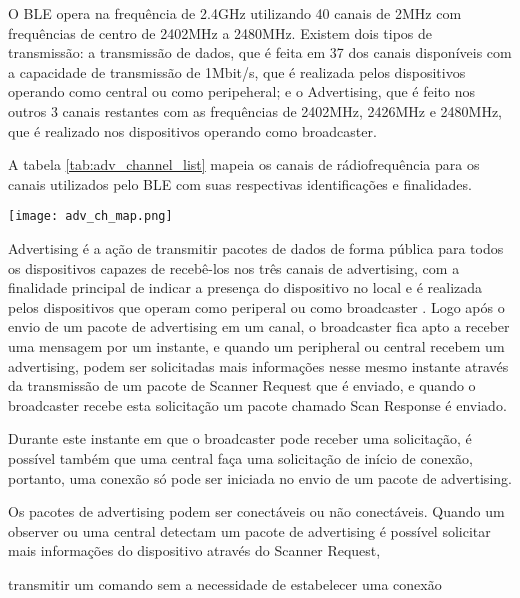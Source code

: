 O BLE opera na frequência de 2.4GHz utilizando 40 canais de 2MHz com
frequências de centro de 2402MHz a 2480MHz. Existem dois tipos de transmissão: a
transmissão de dados, que é feita em 37 dos canais disponíveis com a capacidade
de transmissão de 1Mbit/s, que é realizada pelos dispositivos operando como
central ou como peripeheral; e o Advertising, que é feito nos outros 3 canais
restantes com as frequências de 2402MHz, 2426MHz e 2480MHz, que
é realizado nos dispositivos operando como broadcaster.\cite{ble4core}

A tabela \ref{tab:adv_channel_list} mapeia os canais de rádiofrequência para os canais
utilizados pelo BLE com suas respectivas identificações e finalidades. 	

\begin{center}
	\centering 
	\texttt{[image: adv\_ch\_map.png]}
	\label{tab:adv_channel_list}
\end{center} 
 
Advertising é a ação de transmitir pacotes de dados de forma pública para todos
os dispositivos capazes de recebê-los nos três canais de advertising, com a
finalidade principal de indicar a presença do dispositivo no local e é
realizada pelos dispositivos que operam como periperal ou como broadcaster
\cite{ble4core}. Logo após o envio de um pacote de advertising em um  canal, o
broadcaster fica apto a receber uma mensagem por um instante, e quando um
peripheral ou central recebem um advertising, podem ser solicitadas mais
informações nesse mesmo instante através da transmissão de um pacote de Scanner
Request que é enviado, e quando o broadcaster recebe esta solicitação um pacote
chamado Scan Response é enviado.

Durante este instante em que o broadcaster pode receber uma solicitação, é
possível também que uma central faça uma solicitação de início de conexão,
portanto, uma conexão só pode ser iniciada no envio de um pacote de advertising. 

Os pacotes de advertising podem
ser conectáveis ou não conectáveis.
Quando um observer ou uma central detectam um pacote de advertising é possível solicitar mais informações do
dispositivo através do Scanner Request, 

 transmitir um comando sem a
necessidade de estabelecer uma conexão

% 
% 
% 

